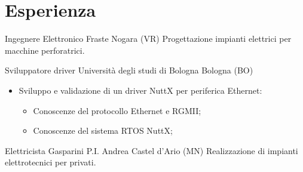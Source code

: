 \section{Esperienza}

        {Ingegnere Elettronico}
        {Fraste}
        {Nogara (VR)}{}
        {Progettazione impianti elettrici per macchine perforatrici.}

\vspace{2mm}

        {Sviluppatore driver}
        {Università degli studi di Bologna}
        {Bologna (BO)}{}
        {
          \begin{itemize}
            \item Sviluppo e validazione di un driver NuttX per periferica Ethernet:
              \begin{itemize}
                \item Conoscenze del protocollo Ethernet e RGMII;
                \item Conoscenze del sistema RTOS NuttX;
              \end{itemize}
          \end{itemize}
        }

\vspace{2mm}

        {Elettricista}
        {Gasparini P.I. Andrea}
        {Castel d'Ario (MN)}{}
        {Realizzazione di impianti elettrotecnici per privati.}
